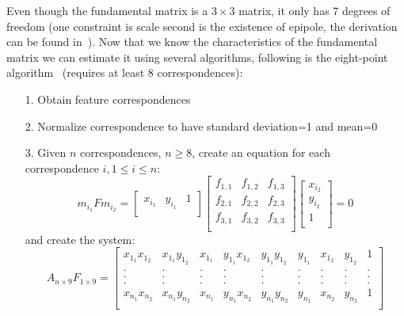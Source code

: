 Even though the fundamental matrix is a $3 \times 3$ matrix, it only has 7 degrees of freedom (one constraint is scale second is the existence of epipole, the derivation can be found in~\cite{book:multiple_view_geometry}). Now that we know the characteristics of the fundamental matrix we can estimate it using several algorithms, following is the eight-point algorithm~\cite{cvfx, elements-of-computer-vision, book:multiple_view_geometry} (requires at least 8 correspondences):
\begin{itemize}
	\item[1.] Obtain feature correspondences 
	\item[2.] Normalize correspondence to have standard deviation=1 and mean=0
	\item[3.] Given $n$ correspondences, $n \geq 8$, create an equation for each correspondence $i, 1 \leq i \leq n$:
	\begin{equation}
		m_{i_1} F m_{i_2} = 
		\begin{bmatrix}
			x_{i_1} & y_{i_1} & 1 \\
		\end{bmatrix}
		\begin{bmatrix}
			f_{1,1} & f_{1,2} & f_{1,3} \\
			f_{2,1} & f_{2,2} & f_{2,3} \\
			f_{3,1} & f_{3,2} & f_{3,3} \\
		\end{bmatrix}
		\begin{bmatrix}
			x_{i_2} \\
			y_{i_2} \\
			1 \\
		\end{bmatrix}
		= 0
	\end{equation}
	and create the system:
	\begin{equation}
		A_{n \times 9}F_{1 \times 9}=
		\begin{bmatrix}
			x_{1_1} x_{1_2} & x_{1_1} y_{1_2}  & x_{1_1}  & y_{1_1} x_{1_2} & y_{1_1} y_{1_2}  & y_{1_1}  & x_{1_2} & y_{1_2}  & 1 \\
			. & . & . & . & . & . & . & . & .\\
			. & . & . & . & . & . & . & . & .\\
			. & . & . & . & . & . & . & . & .\\
			x_{n_1} x_{n_2} & x_{n_1} y_{n_2}  & x_{n_1}  & y_{n_1} x_{n_2} & y_{n_1} y_{n_2}  & y_{n_1}  & x_{n_2} & y_{n_2}  & 1 \\
		\end{bmatrix}

\end{equation}
\end{itemize}
